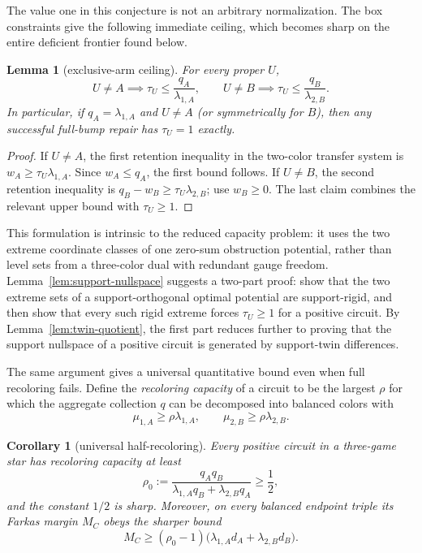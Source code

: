\documentclass[11pt]{article}
\newtheorem{lemma}[theorem]{Lemma}
\newtheorem{corollary}[theorem]{Corollary}
\begin{document}
The value one in this conjecture is not an arbitrary normalization.  The box
constraints give the following immediate ceiling, which becomes sharp on the
entire deficient frontier found below.

\begin{lemma}[exclusive-arm ceiling]
\label{lem:exclusive-arm-ceiling}
For every proper $U$,
\[
 U\ne A\implies\tau_U\leq \frac{q_A}{\lambda_{1,A}},
 \qquad
 U\ne B\implies\tau_U\leq \frac{q_B}{\lambda_{2,B}}.
\]
In particular, if $q_A=\lambda_{1,A}$ and $U\ne A$ (or symmetrically for
$B$), then any successful full-bump repair has $\tau_U=1$ exactly.
\end{lemma}

\begin{proof}
If $U\ne A$, the first retention inequality in the two-color transfer
system is $w_A\geq\tau_U\lambda_{1,A}$. Since $w_A\leq q_A$, the first
bound follows.  If $U\ne B$, the second retention inequality is
$q_B-w_B\geq\tau_U\lambda_{2,B}$; use $w_B\geq0$.  The last claim combines
the relevant upper bound with $\tau_U\geq1$.
\end{proof}

This formulation is intrinsic to the reduced capacity problem: it uses the
two extreme coordinate classes of one zero-sum obstruction potential, rather
than level sets from a three-color dual with redundant gauge freedom.
Lemma~\ref{lem:support-nullspace} suggests a two-part proof: show that the two
extreme sets of a support-orthogonal optimal potential are
support-rigid, and then show that every such rigid extreme forces
$\tau_U\geq1$ for a positive circuit.
By Lemma~\ref{lem:twin-quotient}, the first part reduces further to proving
that the support nullspace of a positive circuit is generated by support-twin
differences.

The same argument gives a universal quantitative bound even when full
recoloring fails. Define the \emph{recoloring capacity} of a circuit to be the
largest $\rho$ for which the aggregate collection $q$ can be decomposed into
balanced colors with
\[
 \mu_{1,A}\geq\rho\lambda_{1,A},\qquad
 \mu_{2,B}\geq\rho\lambda_{2,B}.
\]

\begin{corollary}[universal half-recoloring]
\label{cor:half-recoloring}
Every positive circuit in a three-game star has recoloring capacity at least
\[
 \rho_0:=\frac{q_Aq_B}
 {\lambda_{1,A}q_B+\lambda_{2,B}q_A}\geq\frac12,
\]
and the constant $1/2$ is sharp. Moreover, on every balanced endpoint triple
its Farkas margin $M_C$ obeys the sharper bound
\[
 M_C\geq(\rho_0-1)
 \bigl(\lambda_{1,A}d_A+\lambda_{2,B}d_B\bigr).
\]
\end{corollary}
\end{document}
